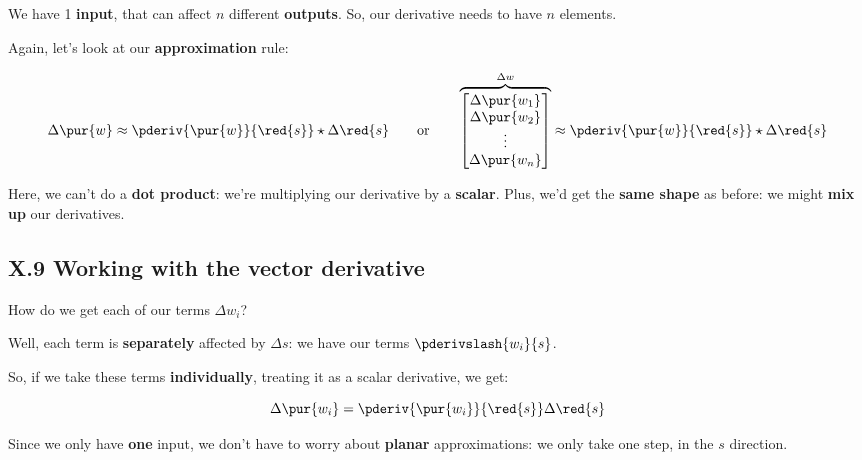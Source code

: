         We have 1 \textbf{input}, that can affect $n$ different \textbf{outputs}. So, our derivative needs to have $n$ elements.
        
        Again, let's look at our \textbf{approximation} rule:
        
        \begin{equation}
            \Delta \pur{w}
            \approx
            \pderiv{ \pur{w} }{ \red{s} }  
            \star
            \Delta \red{s}
                \qquad
                \text{or}
                \qquad
            \overbrace{
                \begin{bmatrix}
                    \Delta \pur{w_1}\\ \Delta \pur{w_2}\\ \vdots \\ \Delta \pur{w_n}
                \end{bmatrix}
            }^{\Delta w}
            \approx
            \pderiv{ \pur{w} }{ \red{s} } 
            \star
            \Delta \red{s}
        \end{equation}
        
        Here, we can't do a \textbf{dot product}: we're multiplying our derivative by a \textbf{scalar}. Plus, we'd get the \textbf{same shape} as before: we might \textbf{mix up} our derivatives.
    
    \secdiv
    
    \subsection*{X.9 \quad Working with the vector derivative}   
        
        How do we get each of our terms $\Delta w_i$?
        
        Well, each term is \textbf{separately} affected by $\Delta s$: we have our terms $\pderivslash{w_i}{s}$.
        
        So, if we take these terms \textbf{individually}, treating it as a scalar derivative, we get:
            
        \begin{equation}
            \Delta \pur{w_i} = \pderiv{\pur{w_i}}{\red{s}} \Delta \red{s}
        \end{equation}
        
        Since we only have \textbf{one} input, we don't have to worry about \textbf{planar} approximations: we only take one step, in the $s$ direction.
        
